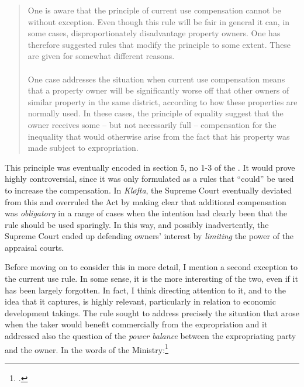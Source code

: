 \begin{quote}
One is aware that the principle of current use compensation cannot be without exception. Even though this rule will be fair in general it can, in some cases, disproportionately disadvantage property owners. One has therefore suggested rules that modify the principle to some extent. These are given for somewhat different reasons. \\ \\

One case addresses the situation when current use compensation means that a property owner will be significantly worse off that other owners of similar property in the same district, according to how these properties are normally used. In these cases, the principle of equality suggest that the owner receives some -- but not necessarily full -- compensation for the inequality that would otherwise arise from the fact that his property was made subject to expropriation. %
\end{quote}

This principle was eventually encoded in section 5, no 1-3 of the \cite{ca73}. It would prove highly controversial, since it was only formulated as a rules that ``could'' be used to increase the compensation. In \emph{Kløfta}, the Supreme Court eventually deviated from this and overruled the Act by making clear that additional compensation was \emph{obligatory} in a range of cases when the intention had clearly been that the rule should be used sparingly. In this way, and possibly inadvertently, the Supreme Court ended up defending owners' interest by \emph{limiting} the power of the appraisal courts.

Before moving on to consider this in more detail, I mention a second exception to the current use rule. In some sense, it is the more interesting of the two, even if it has been largely forgotten. In fact, I think directing attention to it, and to the idea that it captures, is highly relevant, particularly in relation to economic development takings. The rule sought to address precisely the situation that arose when the taker would benefit commercially from the expropriation and it addressed also the question of the \emph{power balance} between the expropriating party and the owner. In the words of the Ministry:\footcite[19]{otprp70}

